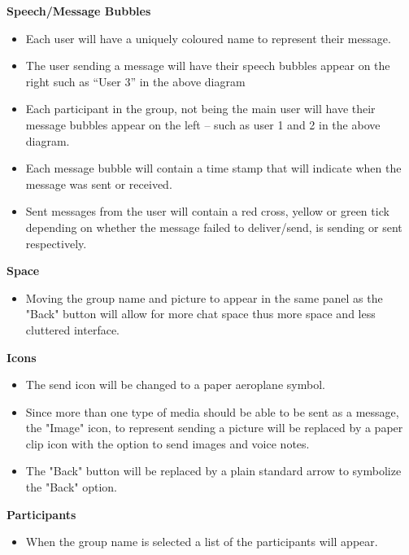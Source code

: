 \documentclass[11pt]{article}
\begin{document}
\textbf{Speech/Message Bubbles}\\
\begin{itemize}
\item	Each user will have a uniquely coloured name to represent their message.
\item	The user sending a message will have their speech bubbles appear on the right such as “User 3” in the above diagram
\item	Each participant in the group, not being the main user will have their message bubbles appear on the left – such as user 1 and 2 in the above diagram.
\item Each message bubble will contain a time stamp that will indicate when the message was sent or received.
\item Sent messages from the user will contain a red cross, yellow or green tick depending on whether the message failed to deliver/send, is sending or sent respectively.\\
\end{itemize}

\textbf{Space}\\
\begin{itemize}
\item	Moving the group name and picture to appear in the same panel as the "Back" button will allow for more chat space thus more space and less cluttered interface.
\end{itemize}

\textbf{Icons}\\
\begin{itemize}
\item	The send icon will be changed to a paper aeroplane symbol.  
\item Since more than one type of media should be able to be sent as a message, the "Image" icon, to represent sending a picture will be replaced by a paper clip icon with the option to send images and voice notes. 
\item The "Back" button will be replaced by a plain standard arrow to symbolize the "Back" option.  
\end{itemize}

\textbf{Participants}\\
\begin{itemize}
\item	When the group name is selected a list of the participants will appear.
\end{itemize}

\newpage
\end{document}
